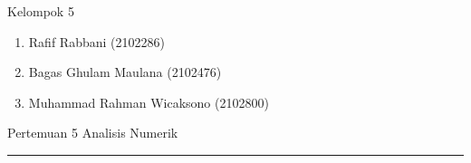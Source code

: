 \documentclass[12pt]{article}
\begin{document}
{}
\sloppy
\newcommand{\unt}{\int\displaylimits}
\newcommand{\jadi}{$\therefore\;$}
\newcommand{\rut}[1]{\sqrt{#1}}
\newcommand{\jgj}{\Leftrightarrow}
\newcommand{\tebal}[1]{\underline{\textbf{#1}}\bigskip}
\newcommand{\infak}{\int\displaylimits^{\infty}_{\infty}}
\newcommand{\lqm}{\lim\displaylimits}

\noindent Kelompok 5
\begin{enumerate}
    \item Rafif Rabbani (2102286)
    \item Bagas Ghulam Maulana (2102476)
    \item Muhammad Rahman Wicaksono (2102800)
\end{enumerate}
Pertemuan 5 Analisis Numerik\\
\noindent\rule{\textwidth}{0.2pt}\bigbreak
\end{document}
